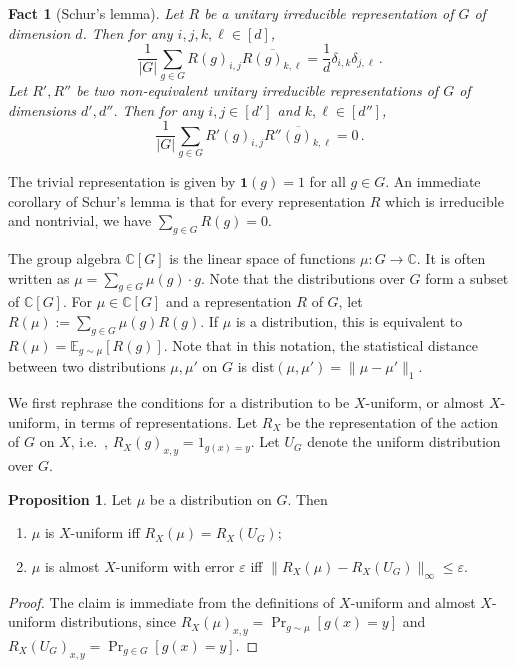 \documentclass[10pt]{article}
\newtheorem{fact}[theorem]{Fact}
\theoremstyle{definition}
\providecommand{\ie}{i.e.\ }
\newtheorem{proposition}[theorem]{Proposition}
\numberwithin{equation}{section}
\def\C{\mathbb{C}}
\def\E{\mathbb{E}}
\def\eps{\varepsilon}
\def\one{\mathbf{1}}
\def\sd{\textrm{dist}}
\begin{document}
\begin{fact}[Schur's lemma]\label{fact:schur}
Let $R$ be a unitary irreducible representation
of $G$ of dimension $d$. Then for any $i,j,k,\ell \in [d]$,
$$
\frac{1}{|G|} \sum_{g \in G} R(g)_{i,j}
\overline{R(g)_{k,\ell}} = \frac{1}{d} \delta_{i,k} \delta_{j,\ell}\,.
$$
Let $R',R''$ be two non-equivalent unitary irreducible
representations of $G$ of dimensions $d',d''$.
Then for any $i,j \in [d']$ and $k,\ell \in [d'']$,
$$
\frac{1}{|G|} \sum_{g \in G} R'(g)_{i,j} \overline{R''(g)_{k,\ell}} = 0\,.
$$
\end{fact}

The trivial representation is given by $\one(g)=1$ for all $g \in G$. An
immediate corollary of Schur's lemma is that
for every representation $R$ which is irreducible
and nontrivial, we have $\sum_{g \in G} R(g)=0$.

The group algebra $\C[G]$ is the linear space of functions $\mu:G \to
\C$. It is often written as $\mu = \sum_{g \in G} \mu(g) \cdot g$. Note
that the distributions over $G$ form
a subset of $\C[G]$. For $\mu \in \C[G]$
and a representation $R$ of $G$, let
$R(\mu) := \sum_{g \in G} \mu(g) R(g)$. If $\mu$ is a distribution,
this is equivalent to $R(\mu) = \E_{g \sim \mu}[R(g)]$. Note that in this
notation, the statistical distance between two distributions $\mu,\mu'$ on
$G$ is $\sd(\mu,\mu')=\|\mu-\mu'\|_1$.


\setcounter{section}{3}\setcounter{theorem}{0}
We first rephrase the conditions for a distribution to be
$X$-uniform, or almost $X$-uniform, in terms of representations. Let
$R_X$ be the representation of the action of $G$ on $X$,
\ie, $R_X(g)_{x,y}=1_{g(x)=y}$. Let $U_G$ denote the uniform distribution
over $G$.

\begin{proposition}\label{prop:rephrase_conditions_dist_Rx}
Let $\mu$ be a distribution on $G$. Then
\begin{enumerate}
\item $\mu$ is $X$-uniform iff $R_X(\mu) = R_X(U_G)$;
\item $\mu$ is almost $X$-uniform with
error $\eps$ iff $\|R_X(\mu)-R_X(U_G)\|_{\infty} \le \eps$.
\end{enumerate}
\end{proposition}

\begin{proof}
The claim is immediate from the definitions of $X$-uniform
and almost $X$-uniform distributions,
since $R_X(\mu)_{x,y}=\Pr_{g \sim \mu}[g(x)=y]$
and $R_X(U_G)_{x,y} = \Pr_{g \in G}[g(x)=y]$.
\end{proof}
\end{document}
